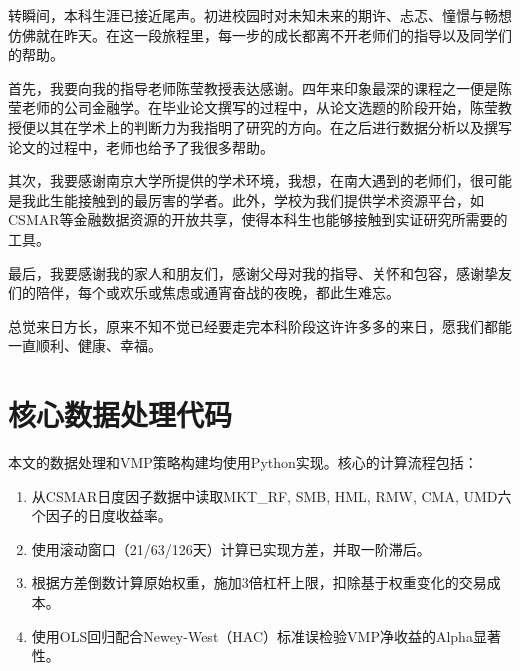 \documentclass[
    decl-page,
    oneside,
  ]{njuthesis}
\begin{document}

\printbibliography


\begin{acknowledgement} 

转瞬间，本科生涯已接近尾声。初进校园时对未知未来的期许、忐忑、憧憬与畅想仿佛就在昨天。在这一段旅程里，每一步的成长都离不开老师们的指导以及同学们的帮助。

首先，我要向我的指导老师陈莹教授表达感谢。四年来印象最深的课程之一便是陈莹老师的公司金融学。在毕业论文撰写的过程中，从论文选题的阶段开始，陈莹教授便以其在学术上的判断力为我指明了研究的方向。在之后进行数据分析以及撰写论文的过程中，老师也给予了我很多帮助。

其次，我要感谢南京大学所提供的学术环境，我想，在南大遇到的老师们，很可能是我此生能接触到的最厉害的学者。此外，学校为我们提供学术资源平台，如CSMAR等金融数据资源的开放共享，使得本科生也能够接触到实证研究所需要的工具。

最后，我要感谢我的家人和朋友们，感谢父母对我的指导、关怀和包容，感谢挚友们的陪伴，每个或欢乐或焦虑或通宵奋战的夜晚，都此生难忘。

总觉来日方长，原来不知不觉已经要走完本科阶段这许许多多的来日，愿我们都能一直顺利、健康、幸福。
\end{acknowledgement}


\appendix

\chapter{核心数据处理代码}

本文的数据处理和VMP策略构建均使用Python实现。核心的计算流程包括：

\begin{enumerate}
  \item 从CSMAR日度因子数据中读取MKT\_RF, SMB, HML, RMW, CMA, UMD六个因子的日度收益率。
  \item 使用滚动窗口（21/63/126天）计算已实现方差，并取一阶滞后。
  \item 根据方差倒数计算原始权重，施加3倍杠杆上限，扣除基于权重变化的交易成本。
  \item 使用OLS回归配合Newey-West（HAC）标准误检验VMP净收益的Alpha显著性。
\end{enumerate}
\end{document}
